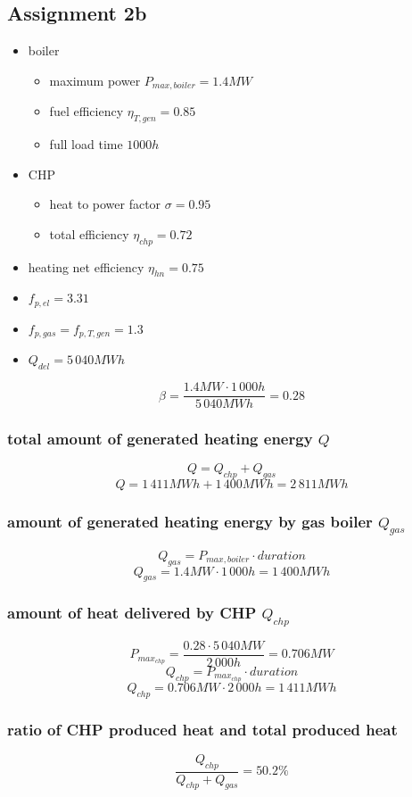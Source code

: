 \documentclass{article}
\begin{document}
	\newpage
	\subsection*{Assignment 2b}
		\begin{itemize}
			\item boiler
				\begin{itemize}
					\item maximum power $P_{max,boiler}=1.4MW$
					\item fuel efficiency $\eta_{T,gen}=0.85$
					\item full load time $1000h$
				\end{itemize}
			\item CHP
				\begin{itemize}
					\item heat to power factor $\sigma=0.95$
					\item total efficiency $\eta_{chp}=0.72$
				\end{itemize}
			\item heating net efficiency $\eta_{hn}=0.75$
			\item $f_{p,el}=3.31$
			\item $f_{p,gas}=f_{p,T,gen}=1.3$
			\item $Q_{del}=5\,040MWh$
		\end{itemize}

		$$\beta=\frac{1.4MW\cdot 1\,000h}{5\,040MWh}=0.28$$

		\subsubsection*{total amount of generated heating energy $Q$}
			$$Q=Q_{chp}+Q_{gas}$$
			$$Q=1\,411MWh+1\,400MWh=2\,811MWh$$
		\subsubsection*{amount of generated heating energy by gas boiler $Q_{gas}$}
			$$Q_{gas}=P_{max,boiler}\cdot duration$$
			$$Q_{gas}=1.4MW\cdot 1\,000h=1\,400MWh$$
		\subsubsection*{amount of heat delivered by CHP $Q_{chp}$}
			$$P_{max_{chp}}=\frac{0.28\cdot 5\,040MW}{2\,000h}=0.706MW$$
			$$Q_{chp}=P_{max_{chp}}\cdot duration$$
			$$Q_{chp}=0.706MW\cdot 2\,000h = 1\,411MWh$$
		\subsubsection*{ratio of CHP produced heat and total produced heat}
			$$\frac{Q_{chp}}{Q_{chp}+Q_{gas}}=50.2\%$$
\end{document}
